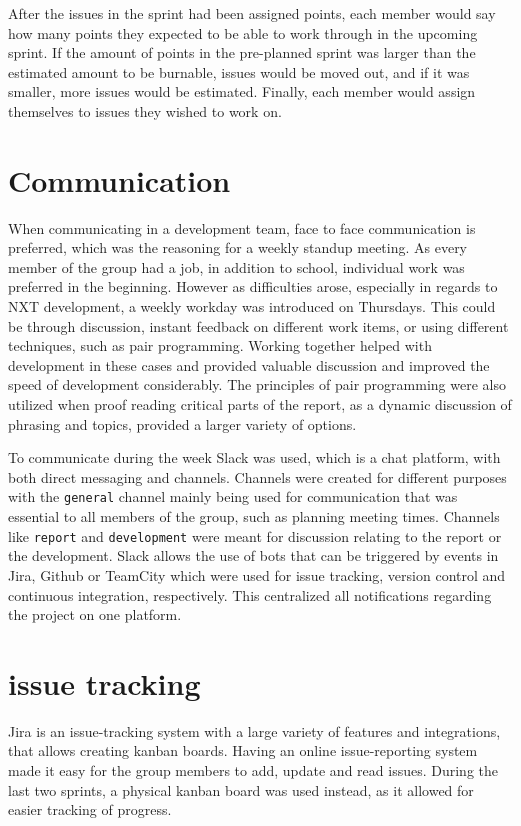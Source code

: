 After the issues in the sprint had been assigned points, each member would say how many points they expected to be able to work through in the upcoming sprint.
If the amount of points in the pre-planned sprint was larger than the estimated amount to be burnable, issues would be moved out, and if it was smaller, more issues would be estimated.
Finally, each member would assign themselves to issues they wished to work on.

\section{Communication}
When communicating in a development team, face to face communication is preferred, which was the reasoning for a weekly standup meeting.
As every member of the group had a job, in addition to school, individual work was preferred in the beginning.
However as difficulties arose, especially in regards to NXT development, a weekly workday was introduced on Thursdays.
This could be through discussion, instant feedback on different work items, or using different techniques, such as pair programming.
Working together helped with development in these cases and provided valuable discussion and improved the speed of development considerably.
The principles of pair programming were also utilized when proof reading critical parts of the report, as a dynamic discussion of phrasing and topics, provided a larger variety of options.

To communicate during the week Slack was used, which is a chat platform, with both direct messaging and channels.
Channels were created for different purposes with the \texttt{general} channel mainly being used for communication that was essential to all members of the group, such as planning meeting times.
Channels like \texttt{report} and \texttt{development} were meant for discussion relating to the report or the development.
Slack allows the use of bots that can be triggered by events in Jira, Github or TeamCity which were used for issue tracking, version control and continuous integration, respectively.
This centralized all notifications regarding the project on one platform.

\section{issue tracking}
Jira is an issue-tracking system with a large variety of features and integrations, that allows creating kanban boards.
Having an online issue-reporting system made it easy for the group members to add, update and read issues. 
During the last two sprints, a physical kanban board was used instead, as it allowed for easier tracking of progress.

